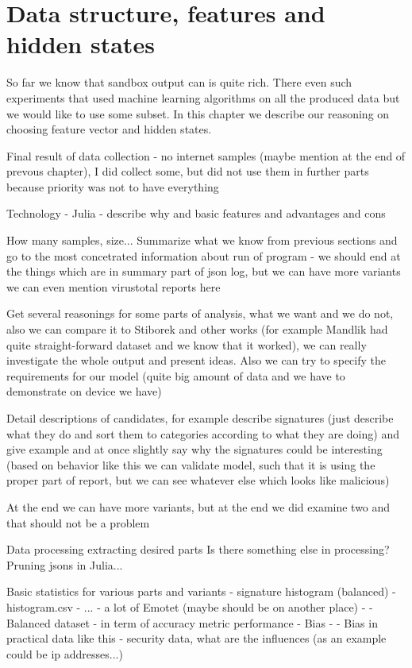 \chapter{Data structure, features and hidden states}
So far we know that sandbox output can is quite rich. There even such experiments that used machine learning algorithms on all the produced data but we would like to use some subset. In this chapter we describe our reasoning on choosing feature vector and hidden states.

Final result of data collection - no internet samples (maybe mention at the end of prevous chapter), I did collect some, but did not use them in further parts because priority was not to have everything

Technology - Julia
  - describe why and basic features and advantages and cons


How many samples, size...
Summarize what we know from previous sections and go to the most concetrated information about run of program - we should end at the things which are in summary part of json log, but we can have more variants
we can even mention virustotal reports here

Get several reasonings for some parts of analysis, what we want and we do not, also we can compare it to Stiborek and other works (for example Mandlik had quite straight-forward dataset and we know that it worked), we can really investigate the whole output and present ideas. Also we can try to specify the requirements for our model (quite big amount of data and we have to demonstrate on device we have)


Detail descriptions of candidates, for example describe signatures (just describe what they do and sort them to categories according to what they are doing) and give example and at once slightly say why the signatures could be interesting (based on behavior like this we can validate model, such that it is using the proper part of report, but we can see whatever else which looks like malicious)

At the end we can have more variants, but at the end we did examine two and that should not be a problem

Data processing
extracting desired parts
Is there something else in processing?
Pruning jsons in Julia...

Basic statistics for various parts and variants
  - signature histogram (balanced) - histogram.csv
  - ...
  - a lot of Emotet (maybe should be on another place)
  - - Balanced dataset - in term of accuracy metric performance
  - Bias - - Bias in practical data like this - security data, what are the influences (as an example could be ip addresses...)


